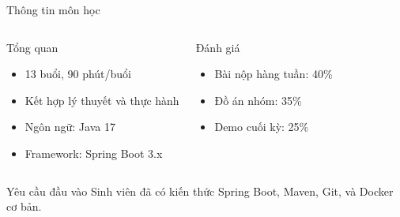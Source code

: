 \documentclass[aspectratio=169,12pt]{beamer}
\begin{document}
\begin{frame}{Thông tin môn học}
  \begin{columns}
    \begin{block}{Tổng quan}
      \begin{itemize}
        \item 13 buổi, 90 phút/buổi
        \item Kết hợp lý thuyết và thực hành
        \item Ngôn ngữ: Java 17
        \item Framework: Spring Boot 3.x
      \end{itemize}
    \end{block}

    \begin{block}{Đánh giá}
      \begin{itemize}
        \item Bài nộp hàng tuần: 40\%
        \item Đồ án nhóm: 35\%
        \item Demo cuối kỳ: 25\%
      \end{itemize}
    \end{block}
  \end{columns}

  \vspace{0.5em}
  \begin{alertblock}{Yêu cầu đầu vào}
    Sinh viên đã có kiến thức Spring Boot, Maven, Git, và Docker cơ bản.
  \end{alertblock}
\end{frame}
\end{document}
